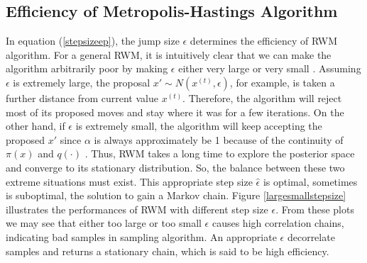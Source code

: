 



\subsection{Efficiency of Metropolis-Hastings Algorithm}\label{effMHA}

In equation (\ref{stepsizeep}), the jump size $\epsilon$ determines the efficiency of RWM algorithm. For a general RWM, it is intuitively clear that we can make the algorithm arbitrarily poor by making $\epsilon$ either very large or very small \citep{sherlock2010random}. Assuming $\epsilon$ is extremely large, the proposal $x'\sim N\left(x^{(t)},\epsilon\right)$, for example, is taken a further distance from current value $x^{(t)}$. Therefore, the algorithm will reject most of its proposed moves and stay where it was for a few iterations. On the other hand, if $\epsilon$ is extremely small, the algorithm will keep accepting the proposed $x'$ since $\alpha$ is always approximately be 1 because of the continuity of $\pi(x)$ and $q(\cdot)$ \citep{roberts2001optimal}. Thus, RWM takes a long time to explore the posterior space and converge to its stationary distribution. So, the balance between these two extreme situations must exist. This appropriate step size $\hat{\epsilon}$ is optimal, sometimes is suboptimal, the solution to gain a Markov chain. Figure \ref{largesmallstepsize} illustrates the performances of RWM with different step size $\epsilon$. From these plots we may see that either too large or too small $\epsilon$ causes high correlation chains, indicating bad samples in sampling algorithm. An appropriate $\epsilon$ decorrelate samples and returns a stationary chain, which is said to be high efficiency. 




